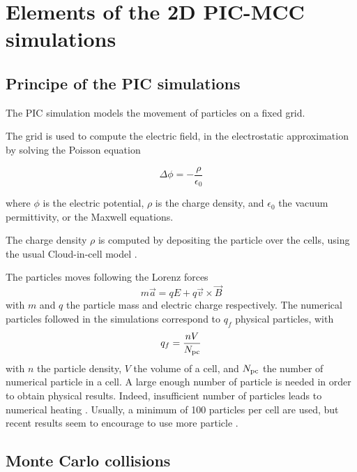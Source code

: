 

\section{Elements of the 2D PIC-MCC simulations}

\subsection{Principe of the PIC simulations}

The \ac{PIC} simulation models the movement of particles on a fixed grid.

The grid is used to compute the electric field, in the electrostatic approximation by solving the Poisson equation

\begin{equation}
  \label{eq-poisson}
  \Delta \phi = - \frac{\rho}{\epsilon_0}
\end{equation}

where $\phi$ is the electric potential, $\rho$ is the charge density, and $\epsilon_0$ the vacuum permittivity, or the Maxwell equations.

The charge density $\rho$ is computed by depositing the particle over the cells, using the usual Cloud-in-cell model \cite{birdsall1991}.

The particles moves following the Lorenz forces
\begin{equation}
  \label{eq-Lor}
  m \vec{a} = q E + q \vec{v} \times \vec{B}
\end{equation}
with $m$ and $q$ the particle mass and electric charge respectively.
The numerical particles followed in the simulations correspond to $q_f$ physical particles, with
\begin{equation}
  q_f = \frac{n V}{N_{\rm pc}}
\end{equation}
with $n$ the particle density, $V$ the volume of a cell, and $N_{\rm pc}$ the number of numerical particle in a cell.
A large enough number of particle is needed in order to obtain physical results.
Indeed, insufficient number of particles leads to numerical heating \cite{ueda1994}.
Usually, a minimum of 100 particles per cell are used, but recent results seem to encourage to use more particle \cite{janhunen2018}.

\subsection{Monte Carlo collisions}

